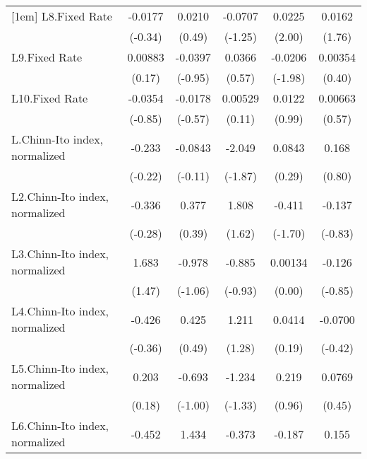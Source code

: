 {\begin{longtable}{l*{5}{c}}
[1em]
L8.Fixed Rate   &  -0.0177         &   0.0210         &  -0.0707         &   0.0225\sym{*}  &   0.0162         \\
                &  (-0.34)         &   (0.49)         &  (-1.25)         &   (2.00)         &   (1.76)         \\
[1em]
L9.Fixed Rate   &  0.00883         &  -0.0397         &   0.0366         &  -0.0206\sym{*}  &  0.00354         \\
                &   (0.17)         &  (-0.95)         &   (0.57)         &  (-1.98)         &   (0.40)         \\
[1em]
L10.Fixed Rate  &  -0.0354         &  -0.0178         &  0.00529         &   0.0122         &  0.00663         \\
                &  (-0.85)         &  (-0.57)         &   (0.11)         &   (0.99)         &   (0.57)         \\
[1em]
L.Chinn-Ito index, normalized&   -0.233         &  -0.0843         &   -2.049         &   0.0843         &    0.168         \\
                &  (-0.22)         &  (-0.11)         &  (-1.87)         &   (0.29)         &   (0.80)         \\
[1em]
L2.Chinn-Ito index, normalized&   -0.336         &    0.377         &    1.808         &   -0.411         &   -0.137         \\
                &  (-0.28)         &   (0.39)         &   (1.62)         &  (-1.70)         &  (-0.83)         \\
[1em]
L3.Chinn-Ito index, normalized&    1.683         &   -0.978         &   -0.885         &  0.00134         &   -0.126         \\
                &   (1.47)         &  (-1.06)         &  (-0.93)         &   (0.00)         &  (-0.85)         \\
[1em]
L4.Chinn-Ito index, normalized&   -0.426         &    0.425         &    1.211         &   0.0414         &  -0.0700         \\
                &  (-0.36)         &   (0.49)         &   (1.28)         &   (0.19)         &  (-0.42)         \\
[1em]
L5.Chinn-Ito index, normalized&    0.203         &   -0.693         &   -1.234         &    0.219         &   0.0769         \\
                &   (0.18)         &  (-1.00)         &  (-1.33)         &   (0.96)         &   (0.45)         \\
[1em]
L6.Chinn-Ito index, normalized&   -0.452         &    1.434         &   -0.373         &   -0.187         &    0.155         \\

\end{longtable}}

